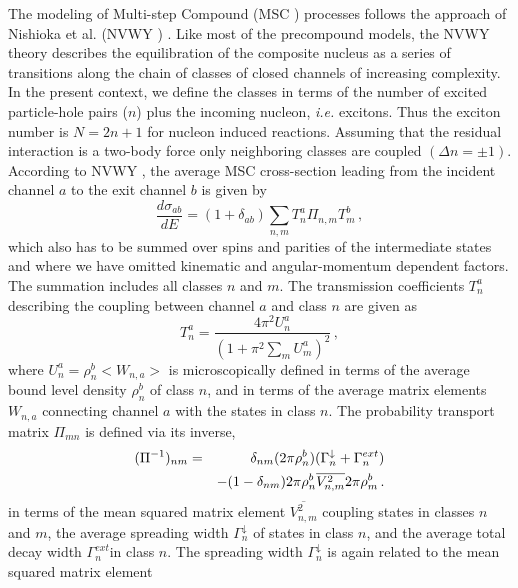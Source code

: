 The modeling of Multi-step Compound%
 (MSC%
) processes follows the approach of Nishioka et al. (NVWY%
) \cite{NVWY}. Like most of the precompound models, the NVWY
theory describes the equilibration of the composite nucleus as a series of
transitions along the chain of classes of closed channels of increasing
complexity. In the present context, we define the classes in terms of the
number of excited particle-hole pairs ($n$) plus the incoming nucleon, 
\textit{i.e.} excitons. Thus the exciton number is $N=2n+1$ for nucleon
induced reactions. Assuming that the residual interaction is a two-body
force only neighboring classes are coupled $(\Delta n=\pm1)$. According to
NVWY%
, the average MSC%
 cross-section leading from the incident channel $a$ to the exit
channel $b$ is given by 
\begin{equation}
\frac{d\sigma_{ab}}{dE}=(1+\delta_{ab})\sum_{n,m}T_{n}^{a}\Pi_{n,m}T_{m}^{b}%
\,,  \label{msccs}
\end{equation}
which also has to be summed over spins and parities of the intermediate
states and where we have omitted kinematic and angular-momentum dependent
factors. The summation includes all classes $n$ and $m$. The transmission
coefficients $T_{n}^{a}$ describing the coupling between channel $a$ and
class $n$ are given as 
\begin{equation}
T_{n}^{a}=\frac{4\pi^{2}U_{n}^{a}}{\left(1+\pi^{2}\sum_{m}U_{m}^{a}%
\right)^{2}}\,,  \label{TlMSC}
\end{equation}
\noindent where $U_{n}^{a}=\rho_{n}^{b}<W_{n,a}>$ is microscopically defined
in terms of the average bound level density%
 $\rho_{n}^{b}$ of class $n$, and in terms of the
average matrix elements $W_{n,a}$ connecting channel $a$ with the states in
class $n$. The probability transport matrix $\Pi_{mn}$ is defined via its
inverse, 
\begin{eqnarray}
(\Pi^{-1})_{nm}&=&\delta_{nm}(2\pi\rho_{n}^{b})(\Gamma_{n}^{\downarrow}+%
\Gamma_{n}^{ext})  \notag \\
&&-(1-\delta_{nm})2\pi\rho_{n}^{b}%
\overline{V_{n,m}^{2}}2\pi\rho_{m}^{b}\,.  \label{Pi}
\end{eqnarray}
in terms of the mean squared matrix element $\overline{V_{n,m}^{2}}$
coupling states in classes $n$ and $m$, the average spreading width $%
\Gamma_{n}^{\downarrow}$ of states in class $n$, and the average total decay
width $\Gamma_{n}^{ext}$in class $n$. The spreading width $%
\Gamma_{n}^{\downarrow}$ is again related to the mean squared matrix element 
